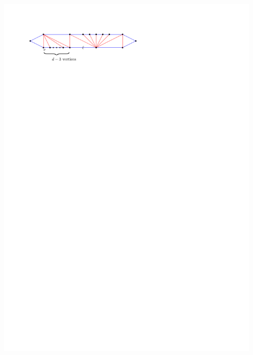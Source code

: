 \documentclass[a4paper]{article}
\begin{document}
\includegraphics[scale=1]{blueFaceSubdivision/img/worstCaseWithTopFan}
\clearpage%
\end{document}

